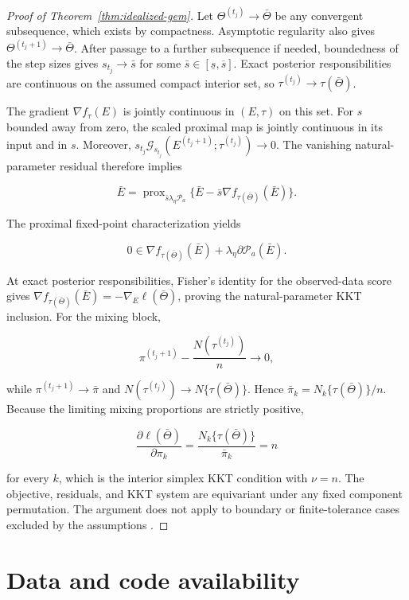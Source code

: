 \documentclass[preprint,12pt,authoryear]{elsarticle}
\begin{document}
\begin{proof}[Proof of Theorem~\ref{thm:idealized-gem}]
Let $\Theta^{(t_j)}\to\bar\Theta$ be any convergent subsequence, which exists
by compactness. Asymptotic regularity also gives
$\Theta^{(t_j+1)}\to\bar\Theta$. After passage to a further subsequence if
needed, boundedness of the step sizes gives $s_{t_j}\to\bar s$ for some
$\bar s\in[\underline s,\overline s]$. Exact posterior responsibilities are
continuous on the assumed compact interior set, so
$\tau^{(t_j)}\to\tau(\bar\Theta)$.

The gradient $\nabla f_\tau(E)$ is jointly continuous in $(E,\tau)$ on this
set. For $s$ bounded away from zero, the scaled proximal map is jointly
continuous in its input and in $s$. Moreover,
$s_{t_j}\mathcal G_{s_{t_j}}
(E^{(t_j+1)};\tau^{(t_j)})\to0$. The vanishing natural-parameter residual
therefore implies

\[
\bar E
=\operatorname{prox}_{\bar s\lambda_\eta\mathcal P_a}
\{\bar E-\bar s\nabla f_{\tau(\bar\Theta)}(\bar E)\}.
\]

The proximal fixed-point characterization yields

\[
0
\in
\nabla f_{\tau(\bar\Theta)}(\bar E)
+\lambda_\eta\partial\mathcal P_a(\bar E).
\]

At exact posterior responsibilities, Fisher's identity for the observed-data
score \citep{louis1982observed} gives
$\nabla f_{\tau(\bar\Theta)}(\bar E)=-\nabla_E\ell(\bar\Theta)$, proving the
natural-parameter KKT inclusion. For the mixing block,

\[
\pi^{(t_j+1)}-\frac{N(\tau^{(t_j)})}{n}\longrightarrow0,
\]

while $\pi^{(t_j+1)}\to\bar\pi$ and
$N(\tau^{(t_j)})\to N\{\tau(\bar\Theta)\}$. Hence
$\bar\pi_k=N_k\{\tau(\bar\Theta)\}/n$. Because the limiting mixing proportions are
strictly positive,

\[
\frac{\partial\ell(\bar\Theta)}{\partial\pi_k}
=\frac{N_k\{\tau(\bar\Theta)\}}{\bar\pi_k}
=n
\]

for every $k$, which is the interior simplex KKT condition with $\nu=n$.
The objective, residuals, and KKT system are equivariant under any fixed
component permutation. The argument does not apply to boundary or
finite-tolerance cases excluded by the assumptions
\citep{green1990penalizedem,wu1983em,tseng2004emproximal}.
\end{proof}

\section*{Data and code availability}
\end{document}
